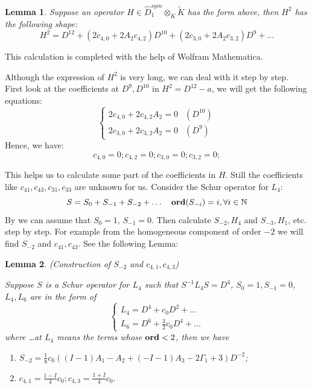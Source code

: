 \documentclass[11pt]{article}
\theoremstyle{definition}
\theoremstyle{plain}
\newtheorem{lemma}{Lemma}[section]
\numberwithin{equation}{section}
\newcommand{\Ord}{\mathop {\rm \bf ord}}
\begin{document}
\begin{lemma}
\label{L:2}
	Suppose an operator $H\in \hat{D}_{1}^{sym}\otimes_{K}\tilde{K}$ has the form above, then $H^2$ has the following shape:
$$
H^2= D^{12}+(2 c_{4,0}+ 2 A_2 c_{4,2}) D^{10}+ (2 c_{3,0} + 
2 A_2 c_{3,2}) D^9    + \dots
$$
\end{lemma}

This calculation is completed with the help of Wolfram Mathematica. 

Although the expression of $H^2$ is very long, we can deal with it step by step. First look at the coefficients at $D^9,D^{10}$ in $H^2=D^{12}-a$, we will get the following equations:
\begin{equation}\label{E ii}
\begin{cases}
2c_{4,0}+2c_{4,2}A_{2}=0 & (D^{10}) \\
2c_{3,0}+2c_{3,2}A_{2}=0 & (D^{9})
\end{cases}
\end{equation}
Hence, we have:
$$
c_{4,0}=0;c_{4,2}=0;c_{3,0}=0;c_{3,2}=0;
$$

This helps us  to calculate some part of the coefficients in $H$. Still the coefficients like $c_{41},c_{43},c_{31},c_{33}$ are unknown for us. Consider the Schur operator for $L_4$:
\begin{equation}\label{S}
S=S_{0}+S_{-1}+S_{-2}+\ldots \quad \Ord(S_{-i})=i,\forall i\in \mathbb{N}
\end{equation}
 By \cite[Prop. 2.3]{GZ24}  we can assume that $S_{0}=1$, $S_{-1}=0$. Then calculate $S_{-2},H_4$ and $S_{-3},H_1$, etc. step by step. For example from the homogeneous component of order $-2$ we will find $S_{-2}$ and $c_{41},c_{43}$. See the following Lemma:

\begin{lemma}{(Construction of $S_{-2}$ and $c_{4,1},c_{4,3}$)}
	\label{L:c41}

 Suppose $S$ is a Schur operator for $L_4$ such that $S^{-1}L_4S=D^4$, $S_{0}=1, S_{-1}=0$, $L_4,L_6$ are in the form of 
$$
\begin{cases}
L_4=D^4+c_0 D^2+\dots \\
L_6=D^6+\frac{3}{2}c_0 D^4+\dots
\end{cases}
$$ 
where \dots at $L_4$ means the terms whose $\Ord <2$, then we have
\begin{enumerate}
	\item $S_{-2}=\frac{1}{8}c_0((I-1)A_1-A_2+(-I-1)A_3-2\Gamma_1+3)D^{-2}$;
	\item $c_{4,1} = \frac{1 - I}{4} c_0;c_{4,3} =\frac{1 + I}{4} c_0.$
\end{enumerate}
\end{lemma}
\end{document}
